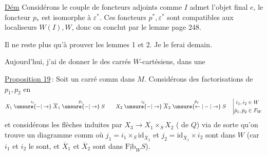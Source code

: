 \uline{Dém} Considérons le couple de foncteurs adjoints
comme $I$ admet  l'objet final $e$, le foncteur $p_*$ est isomorphe à $\varepsilon^*$. Ces foncteurs $p^*,\varepsilon^*$ sont compatibles aux localiseurs\unsure{,|} $W(I),W$, donc on conclut par le lemme page 248.

Il ne reste plus qu'à prouver les lemmes 1 et 2. Je le ferai demain.

Aujourd'hui, j'ai  de donner le  des carrés $W$-cartésiens, dans une

\uline{Proposition 19}\,: Soit
un carré comm dans $M$. Considérons des factorisations de $p_1,p_2$ en
\[
X_1\mathrel{\overset{i_1}{\unsure{-|\to}}}\overline X_1\mathrel{\overset{\bar p_1}{\unsure{-|\to}}}S
\qquad X_2\mathrel{\overset{i_2}{\unsure{-|\to}}}\overline X_2\mathrel{\overset{\bar p_2}{\unsure{\leftarrow|-|\to}}}S
\quad\left|\begin{aligned}i_1,i_2&\in W\\ \bar p_1,\bar p_2&\in F_W\end{aligned}\right.
\]
et considérons les flèches induites par $X_3\to X_1\times_S X_2$ ( de $Q$) via
de sorte qu'on trouve  un diagramme comm
où $j_1=i_1\times_S\mathrm{id}_{\overline X_2}$ et $j_2=\mathrm{id}_{\overline X_1}\mathbin{\times}i_2$ sont dans $W$ (car $i_1$ et $i_2$ le sont, et $\overline X_1$ et $\overline X_2$ sont dans $\underline{\mathrm{Fib}}_W S$).

